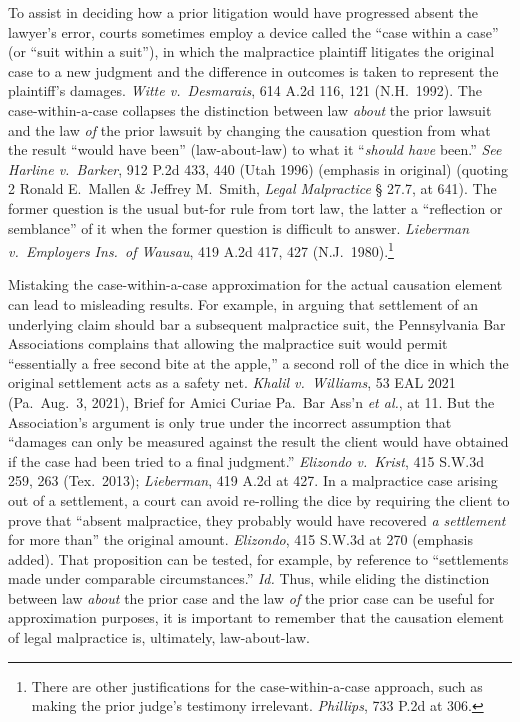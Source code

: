 \documentclass[
  12pt,
  letterpaper,
]{scrartcl}
\begin{document}
To assist in deciding how a prior litigation would have progressed absent the
lawyer's error, courts sometimes employ a device called the ``case within a
case'' (or ``suit within a suit''), in which the malpractice plaintiff
litigates the original case to a new judgment and the difference in outcomes is
taken to represent the plaintiff's damages. \textit{Witte v.~Desmarais}, 614
A.2d 116, 121 (N.H.~1992). The case-within-a-case collapses the distinction
between law \textit{about} the prior lawsuit and the law \textit{of} the prior
lawsuit by changing the causation question from what the result ``would have
been'' (law-about-law) to what it ``\textit{should have} been.'' \textit{See}
\textit{Harline v.~Barker}, 912 P.2d 433, 440 (Utah 1996) (emphasis in
original) (quoting 2 Ronald E.~Mallen \& Jeffrey M.~Smith, \textit{Legal
Malpractice} § 27.7, at 641). The former question is the usual but-for rule
from tort law, the latter a ``reflection or semblance'' of it when the former
question is difficult to answer. \textit{Lieberman v.~Employers Ins.~of
Wausau}, 419 A.2d 417, 427 (N.J.~1980).\footnote{There are other justifications
for the case-within-a-case approach, such as making the prior judge's testimony
irrelevant. \textit{Phillips}, 733 P.2d at 306.}

Mistaking the case-within-a-case approximation for the actual causation element
can lead to misleading results. For example, in arguing that settlement of an
underlying claim should bar a subsequent malpractice suit, the Pennsylvania Bar
Associations complains that allowing the malpractice suit would permit
``essentially a free second bite at the apple,'' a second roll of the dice in
which the original settlement acts as a safety net. \textit{Khalil
v.~Williams}, 53 EAL 2021 (Pa.~Aug.~3, 2021), Brief for Amici Curiae Pa.~Bar
Ass'n \textit{et al.}, at 11. But the Association's argument is only true under
the incorrect assumption that ``damages can only be measured against the result
the client would have obtained if the case had been tried to a final
judgment.'' \textit{Elizondo v.~Krist}, 415 S.W.3d 259, 263 (Tex.~2013);
\textit{Lieberman}, 419 A.2d at 427. In a malpractice case arising out of a
settlement, a court can avoid re-rolling the dice by requiring the client to
prove that ``absent malpractice, they probably would have recovered \emph{a
settlement} for more than'' the original amount. \textit{Elizondo}, 415 S.W.3d
at 270 (emphasis added). That proposition can be tested, for example, by
reference to ``settlements made under comparable circumstances.'' \textit{Id.}
Thus, while eliding the distinction between law \textit{about} the prior case
and the law \textit{of} the prior case can be useful for approximation
purposes, it is important to remember that the causation element of legal
malpractice is, ultimately, law-about-law.
\end{document}
